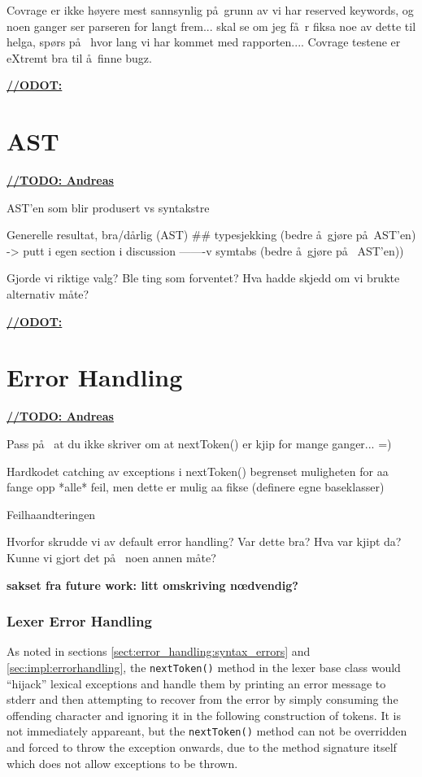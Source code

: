Covrage er ikke h\o yere mest sannsynlig p\aa~grunn av vi har reserved keywords, og noen ganger ser parseren for langt frem... skal se om jeg f\aa~r fiksa noe av dette til helga, sp\o rs p\aa~ hvor lang vi har kommet med rapporten.... Covrage testene er eXtremt bra til \aa~finne bugz.

\underline{\textbf{\LARGE //ODOT:}}

\section{AST}
\underline{\textbf{\LARGE //TODO: Andreas}}

AST'en som blir produsert vs syntakstre

Generelle resultat, bra/d\aa rlig (AST) \#\# typesjekking (bedre \aa~gj\o re p\aa~AST'en) -> putt i egen section i discussion -------v
symtabs (bedre \aa~gj\o re p\aa~ AST'en))

Gjorde vi riktige valg? Ble ting som forventet? Hva hadde skjedd om vi brukte alternativ m\aa te? 

\underline{\textbf{\LARGE //ODOT:}}

\section{Error Handling}
\underline{\textbf{\LARGE //TODO: Andreas}}

Pass p\aa~ at du ikke skriver om at nextToken() er kjip for mange ganger... =)

Hardkodet catching av exceptions i nextToken() begrenset muligheten for aa
fange opp *alle* feil, men dette er mulig aa fikse (definere egne baseklasser)

Feilhaandteringen

Hvorfor skrudde vi av default error handling? Var dette bra? Hva var kjipt da? Kunne vi gjort det p\aa~ noen annen m\aa te?


\textbf{sakset fra future work: litt omskriving n\oe dvendig?}
\subsubsection{Lexer Error Handling}
\label{sect:future_work:lexer_error_handling}
As noted in sections \ref{sect:error_handling:syntax_errors} and
\ref{sec:impl:errorhandling}, the \verb!nextToken()! method in the lexer base class
would ``hijack'' lexical exceptions and handle them by printing an error message
to stderr and then attempting to recover from the error by simply consuming the
offending character and ignoring it in the following construction of tokens. It is 
not immediately appareant, but the \verb!nextToken()! method can not be overridden and
forced to throw the exception onwards, due to the method signature itself which
does not allow exceptions to be thrown. 


